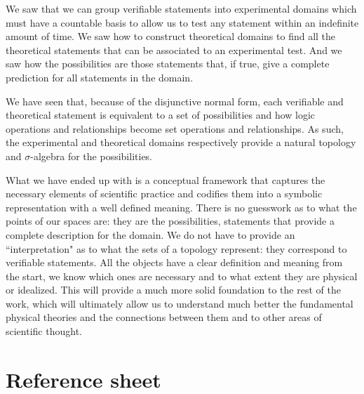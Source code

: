 \documentclass[11pt,letterpaper,fleqn]{memoir} %
\begin{document}
We saw that we can group verifiable statements into experimental domains which must have a countable basis to allow us to test any statement within an indefinite amount of time. We saw how to construct theoretical domains to find all the theoretical statements that can be associated to an experimental test. And we saw how the possibilities are those statements that, if true, give a complete prediction for all statements in the domain.

We have seen that, because of the disjunctive normal form, each verifiable and theoretical statement is equivalent to a set of possibilities and how logic operations and relationships become set operations and relationships. As such, the experimental and theoretical domains respectively provide a natural topology and $\sigma$-algebra for the possibilities.

What we have ended up with is a conceptual framework that captures the necessary elements of scientific practice and codifies them into a symbolic representation with a well defined meaning. There is no guesswork as to what the points of our spaces are: they are the possibilities, statements that provide a complete description for the domain. We do not have to provide an ``interpretation" as to what the sets of a topology represent: they correspond to verifiable statements. All the objects have a clear definition and meaning from the start, we know which ones are necessary and to what extent they are physical or idealized. This will provide a much more solid foundation to the rest of the work, which will ultimately allow us to understand much better the fundamental physical theories and the connections between them and to other areas of scientific thought.



\newpage

\section{Reference sheet}
\end{document}
